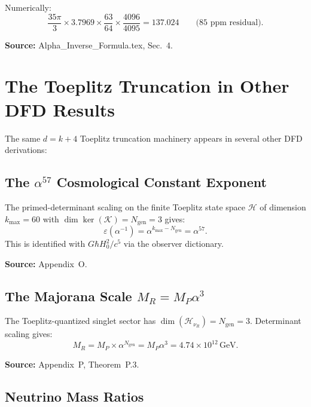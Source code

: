 \documentclass[12pt,a4paper]{article}
\begin{document}
Numerically:
\begin{equation}
\frac{35\pi}{3} \times 3.7969 \times \frac{63}{64} \times \frac{4096}{4095}
= 137.024 \qquad \text{(85~ppm residual)}.
\end{equation}

\textbf{Source:} Alpha\_Inverse\_Formula.tex, Sec.~4.

\section{The Toeplitz Truncation in Other DFD Results}
\label{sec:other}

The same $d = k+4$ Toeplitz truncation machinery appears in several other
DFD derivations:

\subsection{The $\alpha^{57}$ Cosmological Constant Exponent}

The primed-determinant scaling on the finite Toeplitz state space
$\mathcal{H}$ of dimension $k_{\max} = 60$ with $\dim\ker(\mathcal{K})
= N_{\mathrm{gen}} = 3$ gives:
\begin{equation}
\varepsilon(\alpha^{-1}) = \alpha^{k_{\max} - N_{\mathrm{gen}}} = \alpha^{57}.
\end{equation}
This is identified with $G\hbar H_0^2/c^5$ via the observer dictionary.

\textbf{Source:} Appendix~O.

\subsection{The Majorana Scale $M_R = M_P\alpha^3$}

The Toeplitz-quantized singlet sector has $\dim(\mathcal{H}_{\nu_R})
= N_{\mathrm{gen}} = 3$. Determinant scaling gives:
\begin{equation}
M_R = M_P \times \alpha^{N_{\mathrm{gen}}} = M_P \alpha^3
= 4.74 \times 10^{12}\,\mathrm{GeV}.
\end{equation}

\textbf{Source:} Appendix~P, Theorem~P.3.

\subsection{Neutrino Mass Ratios}
\end{document}
